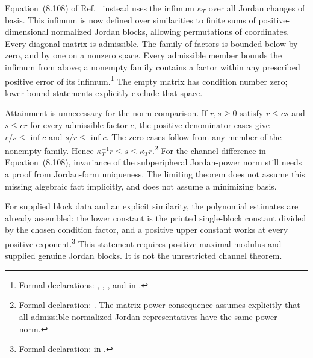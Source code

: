 \documentclass{article}
\begin{document}
Equation~(8.108) of Ref.~\cite{Wolf2012Quantum} instead uses the infimum
$\kappa_T$ over all Jordan changes of basis. This infimum is now defined over
similarities to finite sums of positive-dimensional normalized Jordan blocks,
allowing permutations of coordinates. Every diagonal matrix is admissible.
The family of factors is bounded below by zero, and by one on a nonzero
space. Every admissible member bounds the infimum from above; a nonempty
family contains a factor within any prescribed positive error of its
infimum.\footnote{Formal declarations:
, ,
, and
 in
.}
The empty matrix has condition number zero; lower-bound statements explicitly
exclude that space.

Attainment is unnecessary for the norm comparison. If $r,s\ge0$ satisfy
$r\le cs$ and $s\le cr$ for every admissible factor $c$, the
positive-denominator cases give $r/s\le\inf c$ and $s/r\le\inf c$.
The zero cases follow from any member of the nonempty family. Hence
$\kappa_T^{-1}r\le s\le\kappa_T r$.\footnote{Formal declaration:
. The matrix-power consequence
 assumes explicitly
that all admissible normalized Jordan representatives have the same power
norm.}
For the channel difference in Equation~(8.108), invariance of the
subperipheral Jordan-power norm still needs a proof from Jordan-form
uniqueness. The limiting theorem does not assume this missing algebraic fact
implicitly, and does not assume a minimizing basis.

For supplied block data and an explicit similarity, the polynomial estimates
are already assembled: the lower constant is the printed single-block
constant divided by the chosen condition factor, and a positive upper
constant works at every positive exponent.\footnote{Formal declaration:
 in
.}
This statement requires positive maximal modulus and supplied genuine Jordan
blocks. It is not the unrestricted channel theorem.
\end{document}
